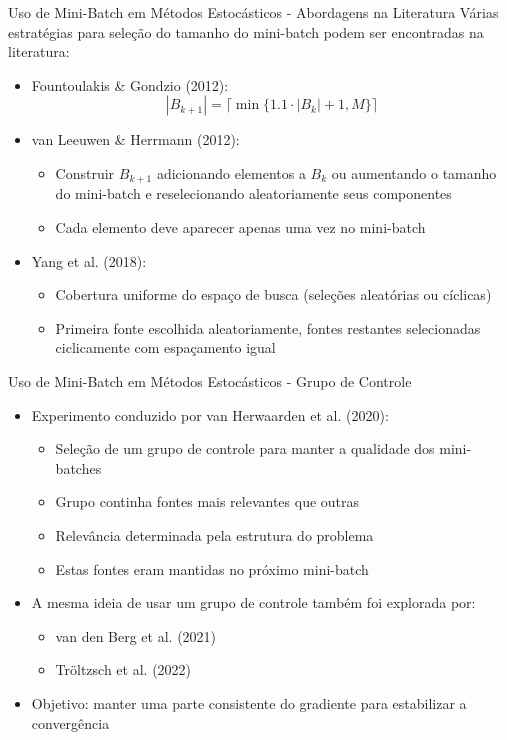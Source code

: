 \documentclass[aspectratio=1610]{beamer}
\begin{document}
\begin{frame}{Uso de Mini-Batch em Métodos Estocásticos - Abordagens na Literatura}
Várias estratégias para seleção do tamanho do mini-batch podem ser encontradas na literatura:

\begin{itemize}
    \item Fountoulakis \& Gondzio (2012): 
    \begin{equation}
    |B_{k+1}| =  \lceil \min \{ 1.1 \cdot |B_k | + 1, M \}\rceil
    \end{equation}
    
    \item van Leeuwen \& Herrmann (2012): 
    \begin{itemize}
        \item Construir $B_{k+1}$ adicionando elementos a $B_{k}$ ou aumentando o tamanho do mini-batch e reselecionando aleatoriamente seus componentes
        \item Cada elemento deve aparecer apenas uma vez no mini-batch
    \end{itemize}
    
    \item Yang et al. (2018): 
    \begin{itemize}
        \item Cobertura uniforme do espaço de busca (seleções aleatórias ou cíclicas)
        \item Primeira fonte escolhida aleatoriamente, fontes restantes selecionadas ciclicamente com espaçamento igual
    \end{itemize}
\end{itemize}
\end{frame}

\begin{frame}{Uso de Mini-Batch em Métodos Estocásticos - Grupo de Controle}
\begin{itemize}
    \item Experimento conduzido por van Herwaarden et al. (2020):
    \begin{itemize}
        \item Seleção de um grupo de controle para manter a qualidade dos mini-batches
        \item Grupo continha fontes mais relevantes que outras
        \item Relevância determinada pela estrutura do problema
        \item Estas fontes eram mantidas no próximo mini-batch
    \end{itemize}
    \item A mesma ideia de usar um grupo de controle também foi explorada por:
    \begin{itemize}
        \item van den Berg et al. (2021)
        \item Tröltzsch et al. (2022)
    \end{itemize}
    \item Objetivo: manter uma parte consistente do gradiente para estabilizar a convergência
\end{itemize}
\end{frame}
\end{document}
